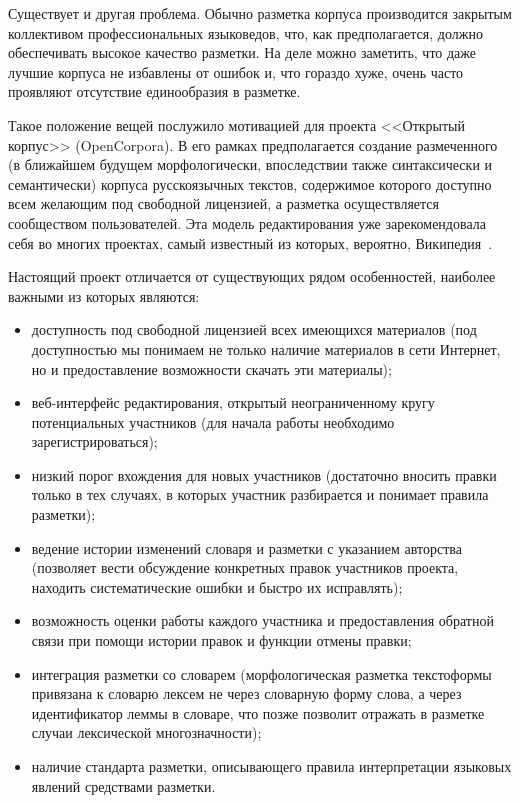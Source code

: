 \documentclass[a4paper]{article}
\begin{document}
Существует и другая проблема. Обычно разметка корпуса производится закрытым коллективом профессиональных языковедов, что, как предполагается, должно обеспечивать высокое качество разметки. На деле можно заметить, что даже лучшие корпуса не избавлены от ошибок и, что гораздо хуже, очень часто проявляют отсутствие единообразия в разметке.

Такое положение вещей послужило мотивацией для проекта <<Открытый корпус>> (OpenCorpora).  В его рамках предполагается создание размеченного (в ближайшем будущем морфологически, впоследствии также синтаксически и семантически) корпуса русскоязычных текстов, содержимое которого доступно всем желающим под свободной лицензией, а разметка осуществляется сообществом пользователей. Эта модель редактирования уже зарекомендовала себя во многих проектах, самый известный из которых, вероятно, Википедия~\cite{ruwiki}.

Настоящий проект отличается от существующих рядом особенностей, наиболее важными из которых являются:
\begin{itemize}
\item доступность под свободной лицензией всех имеющихся материалов (под доступностью мы понимаем не только наличие материалов в сети Интернет, но и предоставление возможности скачать эти материалы);
\item веб-интерфейс редактирования, открытый неограниченному кругу потенциальных участников (для начала работы необходимо зарегистрироваться);
\item низкий порог вхождения для новых участников (достаточно вносить правки только в тех случаях, в которых участник разбирается и понимает правила разметки);
\item ведение истории изменений словаря и разметки с указанием авторства (позволяет вести обсуждение конкретных правок участников проекта, находить систематические ошибки и быстро их исправлять);
\item возможность оценки работы каждого участника и предоставления обратной связи при помощи истории правок и функции отмены правки;
\item интеграция разметки со словарем (морфологическая разметка текстоформы привязана к словарю лексем не через словарную форму слова, а через идентификатор леммы в словаре, что позже позволит отражать в разметке случаи лексической многозначности);
\item наличие стандарта разметки, описывающего правила интерпретации языковых явлений средствами разметки.
\end{itemize}
\end{document}
